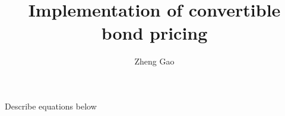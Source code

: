 \documentclass[12pt]{article}
\begin{document}
\title{Implementation of convertible bond pricing}
\author{Zheng Gao}
\maketitle

Describe equations below
\end{document}

